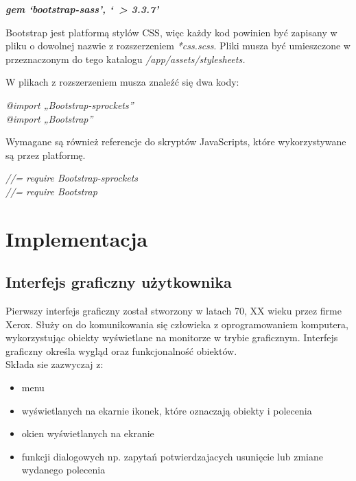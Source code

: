 \documentclass[openright]{xmgr}
\begin{document}
	\begin{center}
		\textbf{\textit{gem ‘bootstrap-sass’, ‘~> 3.3.7’}}
	\end{center}
	Bootstrap jest platformą stylów CSS, więc każdy kod powinien być zapisany w pliku o dowolnej nazwie z rozszerzeniem \textit{*css.scss}. Pliki musza być umieszczone w przeznaczonym do tego katalogu \textit{/app/assets/stylesheets.\textbf{}}\\
	
	\begin{flushleft}
		W plikach z rozszerzeniem musza znaleźć się dwa kody:
	\end{flushleft}
	
	\textit{@import „Bootstrap-sprockets”\textbf{}}\\
	
	\textit{@import „Bootstrap”\textbf{}}\\
	
	
	
	\begin{flushleft}
		Wymagane są również referencje do skryptów JavaScripts, które wykorzystywane są przez platformę.
	\end{flushleft}
	
	\textit{//= require Bootstrap-sprockets\textbf{}}\\
	
	\textit{//= require Bootstrap\textbf{}}
	
	
	\chapter{Implementacja}
	
	\section {Interfejs graficzny użytkownika}
	
	Pierwszy interfejs graficzny został stworzony w latach 70, XX wieku przez firme Xerox. Służy on do komunikowania się człowieka z oprogramowaniem komputera, wykorzystując obiekty wyświetlane na monitorze w trybie graficznym. Interfejs graficzny określa wygląd oraz funkcjonalność obiektów. \\

Składa sie zazwyczaj z:\\
	
\begin{itemize}
	\item
	menu
	
	\item
	 wyświetlanych na ekarnie ikonek, które oznaczają obiekty i polecenia
	
	\item
	okien wyświetlanych na ekranie
	\item
	funkcji dialogowych np. zapytań potwierdzajacych usunięcie lub zmiane wydanego polecenia
\end{itemize}
	
\end{document}
